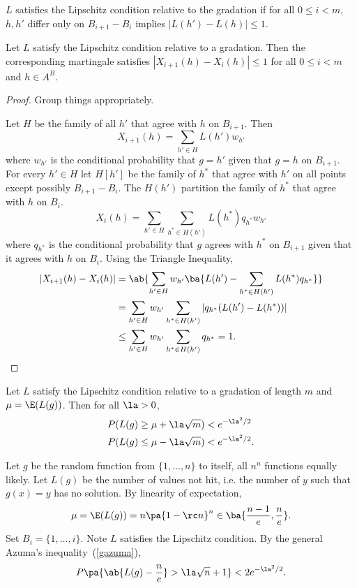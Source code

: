 $L$ satisfies the Lipschitz condition relative to the gradation if for all $0\le i<m$, $h,h'$ differ only on $B_{i+1}-B_i$ implies $|L(h')-L(h)|\le 1$. 
\begin{thm}
Let $L$ satisfy the Lipschitz condition relative to a gradation. 
Then the corresponding martingale satisfies $|X_{i+1}(h)-X_i(h)|\le 1$ for all $0\le i<m$ and $h\in A^B$. 
\end{thm} 
\begin{proof}
Group things appropriately.

Let $H$ be the family of all $h'$ that agree with $h$ on $B_{i+1}$. Then
\[
X_{i+1}(h)=\sum_{h'\in H}L(h')w_{h'}
\]
where $w_{h'}$ is the conditional probability that $g=h'$ given that $g=h$ on $B_{i+1}$. 
For every $h'\in H$ let $H[h']$ be the family of $h^*$ that agree with $h'$ on all points except possibly $B_{i+1}-B_i$. The $H(h')$ partition the family of $h^*$ that agree with $h$ on $B_i$. 
\[
X_i(h)=\sum_{h'\in H}\sum_{h^*\in H(h')} L(h^*) q_{h^*} w_{h'}
\]
where $q_{h^*}$ is the conditional probability that $g$ agrees with $h^*$ on $B_{i+1}$ given that it agrees with $h$ on $B_i$. Using the Triangle Inequality, 
\begin{align*}
|X_{i+1}(h)-X_i(h)|&=\ab{
\sum_{h'\in H} w_{h'}\ba{
L(h')-\sum_{h^*\in H(h')}L(h^*) q_{h^*}
}
}\\
&=\sum_{h'\in H} w_{h'} \sum_{h^*\in H(h')} |q_{h^*} (L(h')-L(h^*))|\\
&\le\sum_{h'\in H}w_{h'}\sum_{h^*\in H(h')} q_{h^*}=1.
\end{align*}
\end{proof}
\begin{thm}\label{gazuma}
Let $L$ satisfy the Lipschitz condition relative to a gradation of length $m$ and $\mu=\E(L(g))$. Then for all $\la>0$,
\begin{align*}
P(L(g)\ge \mu+\la \sqrt m)&<e^{-\la^2/2}\\
P(L(g)\le \mu-\la\sqrt m)&<e^{-\la^2/2}.
\end{align*}
\end{thm}
\begin{ex}
Let $g$ be the random function from $\{1,\ldots, n\}$ to itself, all $n^n$ functions equally likely. Let $L(g)$ be the number of values not hit, i.e. the number of $y$ such that $g(x)=y$ has no solution. By linearity of expectation,
\[
\mu=\E(L(g))=n\pa{1-\rc n}^n\in \ba{
\frac{n-1}e,\frac ne
}.
\]
Set $B_i=\{1,\ldots, i\}$. Note $L$ satisfies the Lipschitz condition. By the general Azuma's inequality~(\ref{gazuma}),
\[
P\pa{\ab{L(g)-\frac ne}>\la\sqrt n+1}<2e^{-\la^2/2}.
\]
\end{ex}
